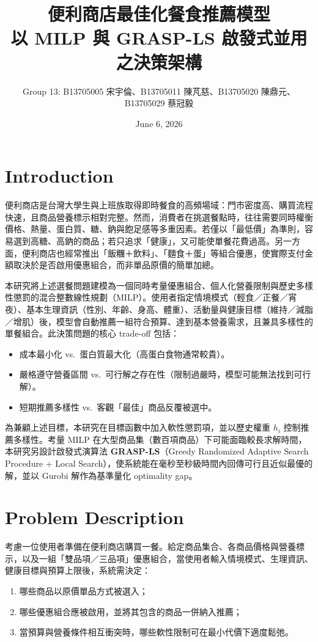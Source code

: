 \documentclass[a4paper]{article}
\title{\vspace{-1.2cm}\textbf{便利商店最佳化餐食推薦模型}\\[2pt]
\large 以 MILP 與 GRASP-LS 啟發式並用之決策架構}
\author{Group 13: B13705005 宋宇倫、B13705011 陳芃慈、B13705020 陳鼎元、B13705029 蔡冠毅}
\date{June 6, 2026}
\begin{document}
\maketitle
\vspace{-0.5cm}

\section{Introduction}
便利商店是台灣大學生與上班族取得即時餐食的高頻場域：門市密度高、購買流程快速，且商品營養標示相對完整。然而，消費者在挑選餐點時，往往需要同時權衡價格、熱量、蛋白質、糖、鈉與飽足感等多重因素。若僅以「最低價」為準則，容易選到高糖、高鈉的商品；若只追求「健康」，又可能使單餐花費過高。另一方面，便利商店也經常推出「飯糰＋飲料」、「麵食＋蛋」等組合優惠，使實際支付金額取決於是否啟用優惠組合，而非單品原價的簡單加總。

本研究將上述選餐問題建模為一個同時考量優惠組合、個人化營養限制與歷史多樣性懲罰的混合整數線性規劃（MILP）。使用者指定情境模式（輕食／正餐／宵夜）、基本生理資訊（性別、年齡、身高、體重）、活動量與健康目標（維持／減脂／增肌）後，模型會自動推薦一組符合預算、達到基本營養需求，且兼具多樣性的單餐組合。此決策問題的核心 trade-off 包括：
\begin{itemize}
\item 成本最小化 vs.\ 蛋白質最大化（高蛋白食物通常較貴）。
\item 嚴格遵守營養區間 vs.\ 可行解之存在性（限制過嚴時，模型可能無法找到可行解）。
\item 短期推薦多樣性 vs.\ 客觀「最佳」商品反覆被選中。
\end{itemize}
為兼顧上述目標，本研究在目標函數中加入軟性懲罰項，並以歷史權重 $h_i$ 控制推薦多樣性。考量 MILP 在大型商品集（數百項商品）下可能面臨較長求解時間，本研究另設計啟發式演算法 \textbf{GRASP-LS}（Greedy Randomized Adaptive Search Procedure + Local Search），使系統能在毫秒至秒級時間內回傳可行且近似最優的解，並以 Gurobi 解作為基準量化 optimality gap。

\section{Problem Description}
考慮一位使用者準備在便利商店購買一餐。給定商品集合、各商品價格與營養標示，以及一組「雙品項／三品項」優惠組合，當使用者輸入情境模式、生理資訊、健康目標與預算上限後，系統需決定：
\begin{enumerate}
\item 哪些商品以原價單品方式被選入；
\item 哪些優惠組合應被啟用，並將其包含的商品一併納入推薦；
\item 當預算與營養條件相互衝突時，哪些軟性限制可在最小代價下適度鬆弛。
\end{enumerate}
\end{document}
